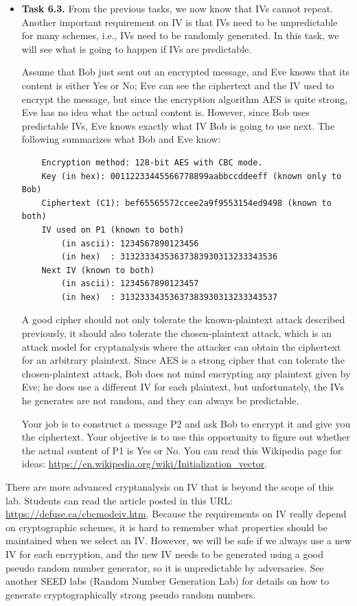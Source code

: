 \documentclass[12pt]{article}
\newcommand\tab[1][0.5cm]{\hspace*{#1}}
\begin{document}
\begin{itemize}
    \item \textbf{Task 6.3.} From the previous tasks, we now know that IVs cannot repeat. Another important requirement on IV is that IVs need to be unpredictable for many schemes, i.e., IVs need to be randomly generated. In this task, we will see what is going to happen if IVs are predictable.
    
    Assume that Bob just sent out an encrypted message, and Eve knows that its content is either Yes or No; Eve can see the ciphertext and the IV used to encrypt the message, but since the encryption algorithm AES is quite strong, Eve has no idea what the actual content is. However, since Bob uses predictable IVs, Eve knows exactly what IV Bob is going to use next. The following summarizes what Bob and Eve know:
    
    \begin{verbatim}
    Encryption method: 128-bit AES with CBC mode.
    Key (in hex): 00112233445566778899aabbccddeeff (known only to Bob)
    Ciphertext (C1): bef65565572ccee2a9f9553154ed9498 (known to both)
    IV used on P1 (known to both)
        (in ascii): 1234567890123456
        (in hex)  : 31323334353637383930313233343536
    Next IV (known to both)
        (in ascii): 1234567890123457
        (in hex)  : 31323334353637383930313233343537
    \end{verbatim}
    
    A good cipher should not only tolerate the known-plaintext attack described previously, it should also tolerate the chosen-plaintext attack, which is an attack model for cryptanalysis where the attacker can obtain the ciphertext for an arbitrary plaintext. Since AES is a strong cipher that can tolerate the chosen-plaintext attack, Bob does not mind encrypting any plaintext given by Eve; he does use a different IV for each plaintext, but unfortunately, the IVs he generates are not random, and they can always be predictable.
    
    Your job is to construct a message P2 and ask Bob to encrypt it and give you the ciphertext. Your objective is to use this opportunity to figure out whether the actual content of P1 is Yes or No. You can read this Wikipedia page for ideas: \url{https://en.wikipedia.org/wiki/Initialization_vector}.
\end{itemize}

    \tab There are more advanced cryptanalysis on IV that is beyond the scope of this lab. Students can read the article posted in this URL: \url{https://defuse.ca/cbcmodeiv.htm}. Because the requirements on IV really depend on cryptographic schemes, it is hard to remember what properties should be maintained when we select an IV. However, we will be safe if we always use a new IV for each encryption, and the new IV needs to be generated using a good pseudo random number generator, so it is unpredictable by adversaries. See another SEED labs (Random Number Generation Lab) for details on how to generate cryptographically strong pseudo random numbers.
\end{document}
